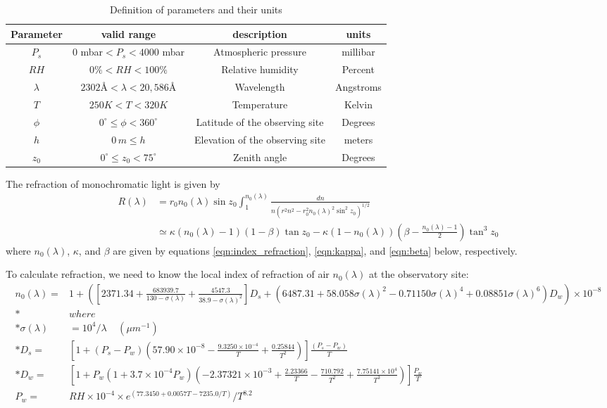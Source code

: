 \documentclass[DM,authoryear,toc]{lsstdoc}
\begin{document}
\begin{table}[h!]
	\begin{center}
	\begin{tabular}{c | c | c | c}
		Parameter & valid range & description & units \\
		\hline
		$P_s$& $0$ mbar$ < P_s < 4000$ mbar & Atmospheric pressure & millibar  \\
		$RH$ & $0\% < RH < 100\%$ & Relative humidity & Percent \\
		$\lambda$& $2302$\AA{}$ < \lambda < 20,586 $\AA{} & Wavelength  & Angstroms \\
		$T$& $250K < T < 320K$ & Temperature & Kelvin \\
		$\phi$ & $0^\circ \leq \phi < 360^\circ$ & Latitude of the observing site & Degrees \\
		$h$ & $0\,m\leq h$ & Elevation of the observing site & meters \\
		$z_0$ & $0^\circ\leq z_0 < 75^\circ$ & Zenith angle & Degrees
		
	\end{tabular}
	\end{center}
	\caption{Definition of parameters and their units}
	\label{table:parameters}
\end{table}

The refraction of monochromatic light is given by
\begin{align}
R(\lambda) &= r_0 n_0(\lambda) \sin z_0 \int_1^{n_0(\lambda)} \frac{dn}{n \left(r^2n^2 -r_0^2n_0(\lambda)^2\sin^2z_0\right)^{1/2}} \nonumber\\
&\simeq \kappa (n_0(\lambda) - 1) (1 - \beta) \tan z_0 - \kappa (1 - n_0(\lambda)) \left(\beta - \frac{n_0(\lambda) - 1}{2}\right) \tan^3z_0
\end{align}
where $n_0(\lambda)$, $\kappa$, and $\beta$ are given by equations \ref{eqn:index_refraction}, \ref{eqn:kappa}, and \ref{eqn:beta} below, respectively.

To calculate refraction, we need to know the local index of refraction of air $n_0(\lambda)$ at the observatory site:
\begin{align}
	n_0(\lambda) =&1 + \left(\left[2371.34 +\frac{683939.7}{130 - \sigma(\lambda)} +\frac{4547.3}{38.9 - \sigma(\lambda)^2}\right] D_s 
		+ \left(6487.31 + 58.058 \sigma(\lambda)^2 - 0.71150 \sigma(\lambda)^4 +0.08851 \sigma(\lambda)^6\right) D_w \right)\times 10^{-8} \label{eqn:index_refraction}\\*
	& where \nonumber\\*
	\sigma(\lambda) &= 10^4 /\lambda \;\;\;\;\left(\mu m^{-1}\right)\nonumber \\*
	D_s =& \left[1 + (P_s-P_w) \left(57.90\times10^{-8} - \frac{9.3250\times10^{-4}}{T}+\frac{0.25844}{T^2}\right)\right] \frac{(P_s-P_w)}{T} \nonumber \\*
	D_w =& \left[1 + P_w \left(1 + 3.7\times10^{-4} P_w\right)\left(-2.37321\times10^{-3} + \frac{2.23366}{T} - \frac{710.792}{T^2} + \frac{7.75141\times10^4}{T^3}\right)\right] \frac{P_w}{T} \nonumber \\
	P_w =& RH\times 10^{-4} \times e^{(77.3450 + 0.0057 T - 7235.0/T)}/T^{8.2} \nonumber
\end{align}
\end{document}
